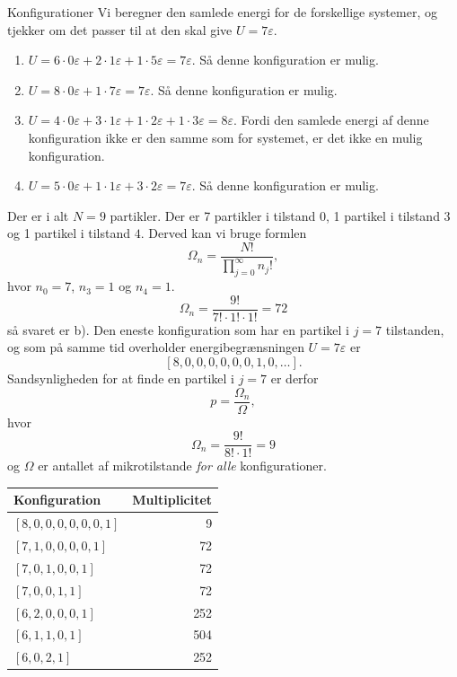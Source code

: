 \begin{opgave}{Konfigurationer}
    \opg Vi beregner den samlede energi for de forskellige systemer, og tjekker om det passer til at den skal give $U=7\varepsilon$.
    \begin{enumerate}[label=\alph*)]
        \item $U=6\cdot 0\varepsilon+2\cdot 1\varepsilon+1\cdot 5\varepsilon=7\varepsilon$. Så denne konfiguration er mulig.
        \item $U=8\cdot 0\varepsilon+1\cdot 7\varepsilon=7\varepsilon$. Så denne konfiguration er mulig.
        \item $U=4\cdot 0\varepsilon+3\cdot 1\varepsilon+1\cdot 2\varepsilon+1\cdot 3\varepsilon=8\varepsilon$. Fordi den samlede energi af denne konfiguration ikke er den samme som for systemet, er det ikke en mulig konfiguration.
        \item $U=5\cdot 0\varepsilon+1\cdot 1\varepsilon+3\cdot 2\varepsilon=7\varepsilon$. Så denne konfiguration er mulig.
    \end{enumerate}
    \[ \]
    \opg Der er i alt $N=9$ partikler. Der er 7 partikler i tilstand $0$, 1 partikel i tilstand $3$ og 1 partikel i tilstand $4$. Derved kan vi bruge formlen
    \[ \Omega_n=\frac{N!}{\prod_{j=0}^\infty n_j!}, \]
    hvor $n_0=7$, $n_3=1$ og $n_4=1$.
    \[ \Omega_n=\frac{9!}{7!\cdot 1!\cdot 1!}=72 \]
    så svaret er b).
    \opg Den eneste konfiguration som har en partikel i $j=7$ tilstanden, og som på samme tid overholder energibegrænsningen $U=7\varepsilon$ er
    \[ [8,0,0,0,0,0,0,1,0,\dots]. \]
    Sandsynligheden for at finde en partikel i $j=7$ er derfor
    \[ p=\frac{\Omega_n}{\Omega}, \]
    hvor
    \[ \Omega_n=\frac{9!}{8!\cdot 1!}=9 \]
    og $\Omega$ er antallet af mikrotilstande \emph{for alle} konfigurationer.
    \begin{table}[H]
        \centering
        \begin{tabular}{lr}
            Konfiguration & Multiplicitet \\ \hline
            $[8,0,0,0,0,0,0,1]$ & 9\\
            $[7,1,0,0,0,0,1]$ & 72\\
            $[7,0,1,0,0,1]$ & 72\\
            $[7,0,0,1,1]$ & 72\\
            $[6,2,0,0,0,1]$ & 252\\
            $[6,1,1,0,1]$ & 504\\
            $[6,0,2,1]$ & 252\\

\end{tabular}
\end{table}
\end{opgave}
